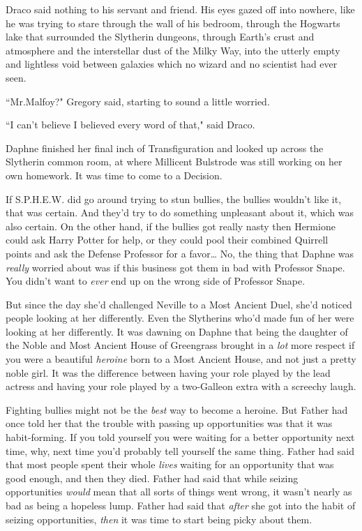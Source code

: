 Draco said nothing to his servant and friend. His eyes gazed off into nowhere, like he was trying to stare through the wall of his bedroom, through the Hogwarts lake that surrounded the Slytherin dungeons, through Earth's crust and atmosphere and the interstellar dust of the Milky Way, into the utterly empty and lightless void between galaxies which no wizard and no scientist had ever seen.

``Mr.\?Malfoy?" Gregory said, starting to sound a little worried.

``I can't believe I believed every word of that," said Draco.

\later

Daphne finished her final inch of Transfiguration and looked up across the Slytherin common room, at where Millicent Bulstrode was still working on her own homework. It was time to come to a Decision.

If S.P.H.E.W. did go around trying to stun bullies, the bullies wouldn't like it, that was certain. And they'd try to do something unpleasant about it, which was also certain. On the other hand, if the bullies got really nasty then Hermione could ask Harry Potter for help, or they could pool their combined Quirrell points and ask the Defense Professor for a favor{\ldots} No, the thing that Daphne was \emph{really} worried about was if this business got them in bad with Professor Snape. You didn't want to \emph{ever} end up on the wrong side of Professor Snape.

But since the day she'd challenged Neville to a Most Ancient Duel, she'd noticed people looking at her differently. Even the Slytherins who'd made fun of her were looking at her differently. It was dawning on Daphne that being the daughter of the Noble and Most Ancient House of Greengrass brought in a \emph{lot} more respect if you were a beautiful \emph{heroine} born to a Most Ancient House, and not just a pretty noble girl. It was the difference between having your role played by the lead actress and having your role played by a two-Galleon extra with a screechy laugh.

Fighting bullies might not be the \emph{best} way to become a heroine. But Father had once told her that the trouble with passing up opportunities was that it was habit-forming. If you told yourself you were waiting for a better opportunity next time, why, next time you'd probably tell yourself the same thing. Father had said that most people spent their whole \emph{lives} waiting for an opportunity that was good enough, and then they died. Father had said that while seizing opportunities \emph{would} mean that all sorts of things went wrong, it wasn't nearly as bad as being a hopeless lump. Father had said that \emph{after} she got into the habit of seizing opportunities, \emph{then} it was time to start being picky about them.

